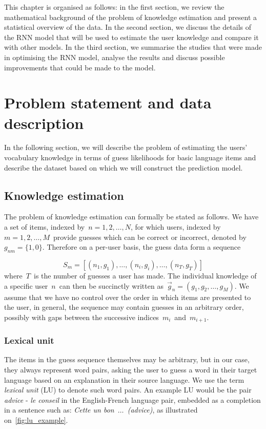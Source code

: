 This chapter is organised as follows: in the first section, we review the mathematical background of the problem of knowledge estimation and present a statistical overview of the data. In the second section, we discuss the details of the RNN model that will be used to estimate the user knowledge and compare it with other models. In the third section, we summarise the studies that were made in optimising the RNN model, analyse the results and discuss possible improvements that could be made to the model.

\section{Problem statement and data description}
In the following section, we will describe the problem of estimating the users' vocabulary knowledge in terms of guess likelihoods for basic language items and describe the dataset based on which we will construct the prediction model.

\subsection{Knowledge estimation}
The problem of knowledge estimation can formally be stated as follows. We have a set of items, indexed by~$n = {1, 2, \dots, N}$, for which users, indexed by~$m  = {1, 2, \dots, M}$~provide guesses which can be correct or incorrect, denoted by~$g_{nm}=\{1, 0\}$. Therefore on a per-user basis, the guess data form a sequence

$$S_m = [(n_1, g_1), \dots, (n_i, g_i), \dots, (n_T, g_T)]$$
where~$T$~is the number of guesses a user has made. The individual knowledge of a specific user~$n$~can then be succinctly written as~$\vec{g}_n = (g_1, g_2, \dots, g_M)$. We assume that we have no control over the order in which items are presented to the user, in general, the sequence may contain guesses in an arbitrary order, possibly with gaps between the successive indices~$m_i$~and~$m_{i+1}$.

\subsubsection{Lexical unit}
The items in the guess sequence themselves may be arbitrary, but in our case, they always represent word pairs, asking the user to guess a word in their target language based on an explanation in their source language. We use the term \textit{lexical unit} (LU) to denote such word pairs. An example LU would be the pair \textit{advice} - \textit{le conseil} in the English-French language pair, embedded as a completion in a sentence such as: \textit{Cette un bon~$\dots$~(advice)}, as illustrated on~\cref{fig:lu_example}.

